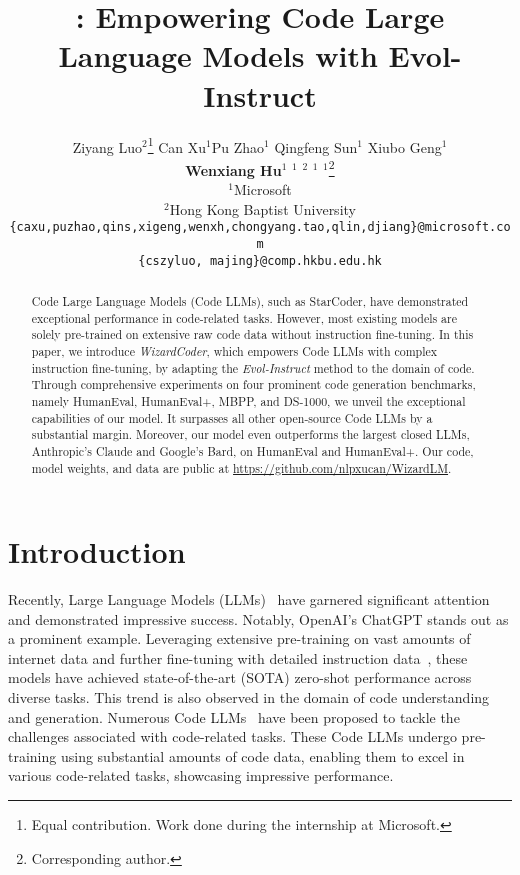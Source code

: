 \documentclass{article}
\title{\modelname{}: Empowering Code Large Language Models with Evol-Instruct}
\author{ \quad  Ziyang Luo$^2$\thanks{\quad Equal contribution. Work done during the internship at Microsoft.}  \quad Can Xu$^1$\footnotemark[1]  \quad Pu Zhao$^1$ \quad Qingfeng Sun$^1$   \quad Xiubo Geng$^1$ \\  {\bf Wenxiang Hu}$^1$ \quad {\bf Chongyang Tao}$^1$ \quad {\bf Jing Ma}$^2$ \quad {\bf Qingwei Lin}$^1$ \quad{\bf Daxin Jiang}$^1$\thanks{\quad  Corresponding author.
 }\\
      $^1$Microsoft\\ $^2$Hong Kong Baptist University \\ 
      \texttt{\{caxu,puzhao,qins,xigeng,wenxh,chongyang.tao,qlin,djiang\}@microsoft.com}\\
      \texttt{\{cszyluo, majing\}@comp.hkbu.edu.hk}
      }
\newcommand{\name}{\emph{Evol-Instruct}}
\newcommand{\modelname}{\emph{WizardCoder}}
\begin{document}
\maketitle
\newcommand{\todo}[1]{\textcolor{brown}{{[#1]}}}






\begin{abstract}

Code Large Language Models (Code LLMs), such as StarCoder, have demonstrated exceptional performance in code-related tasks. However, most existing models are solely pre-trained on extensive raw code data without instruction fine-tuning. In this paper, we introduce \modelname{}, which empowers Code LLMs with complex instruction fine-tuning, by adapting the \name{} method to the domain of code.
Through comprehensive experiments on four prominent code generation benchmarks, namely HumanEval, HumanEval+, MBPP, and DS-1000, we unveil the exceptional capabilities of our model. It surpasses all other open-source Code LLMs by a substantial margin. Moreover, our model even outperforms the largest closed LLMs, Anthropic’s Claude and Google’s Bard, on HumanEval and HumanEval+. Our code, model weights, and data are public at \url{https://github.com/nlpxucan/WizardLM}.

\end{abstract} \section{Introduction}

Recently, Large Language Models (LLMs)~\cite{GPT3,GPT4,PaLM,palm2,Chinchilla,gopher,GLM-130B,llama,opt} have garnered significant attention and demonstrated impressive success. Notably, OpenAI's ChatGPT stands out as a prominent example. Leveraging extensive pre-training on vast amounts of internet data and further fine-tuning with detailed instruction data~\cite{DBLP:conf/nips/Ouyang0JAWMZASR22}, these models have achieved state-of-the-art (SOTA) zero-shot performance across diverse tasks. This trend is also observed in the domain of code understanding and generation. Numerous Code LLMs~\cite{li2023starcoder,AlphaCode,codegen,CodeGeeX,incoder,codex,codet5,CodeT5+} have been proposed to tackle the challenges associated with code-related tasks. These Code LLMs undergo pre-training using substantial amounts of code data, enabling them to excel in various code-related tasks, showcasing impressive performance.
\end{document}
